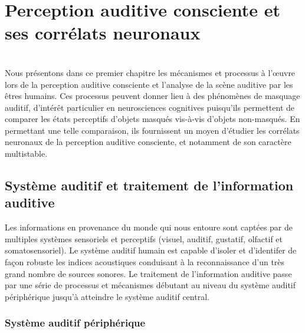 \chapter{Perception auditive consciente et ses corrélats neuronaux}
\label{chapitre1}
\noindent \hrulefill \\

Nous présentons dans ce premier chapitre les mécanismes et processus à l'œuvre lors de la perception auditive consciente et l'analyse de la scène auditive par les êtres humains. 
Ces processus peuvent donner lieu à des phénomènes de masquage auditif, d'intérêt particulier en neurosciences cognitives puisqu'ils permettent de comparer les états perceptifs d'objets masqués vis-à-vis d'objets non-masqués. 
En permettant une telle comparaison, ils fournissent un moyen d'étudier les corrélats neuronaux de la perception auditive consciente, et notamment de son caractère multistable. 

\section{Système auditif et traitement de l'information auditive}
\label{systemeauditif}

Les informations en provenance du monde qui nous entoure sont captées par de multiples systèmes sensoriels et perceptifs (visuel, auditif, gustatif, olfactif et somatosensoriel). 
Le système auditif humain est capable d'isoler et d'identifer de façon robuste les indices acoustiques conduisant à la reconnaissance d'un très grand nombre de sources sonores. 
Le traitement de l'information auditive passe par une série de processus et mécanismes débutant au niveau du système auditif périphérique jusqu'à atteindre le système auditif central.

\subsection{Système auditif périphérique}
\label{systemeauditifperif}

